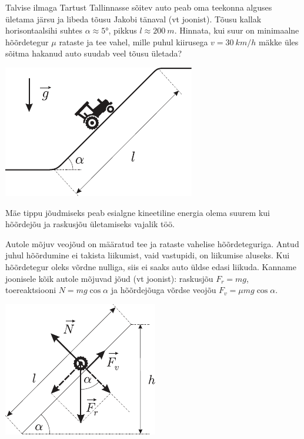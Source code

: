 
Talvise ilmaga Tartust Tallinnasse sõitev auto peab oma teekonna alguses ületama järsu ja libeda tõusu Jakobi tänaval (vt joonist). Tõusu kallak horisontaalsihi suhtes $\alpha \approx \ang{5}$, pikkus $l \approx \SI{200}{m}$. Hinnata, kui suur on minimaalne hõõrdetegur $\mu$ rataste ja tee vahel, mille puhul kiirusega $v = \SI{30}{km/h}$ mäkke üles sõitma hakanud auto suudab veel tõusu ületada?

\begin{center}
	\includegraphics[width=0.5\linewidth]{2005-lahg-02-yl}
\end{center}

\hint
Mäe tippu jõudmiseks peab esialgne kineetiline energia olema suurem kui hõõrdejõu ja raskusjõu ületamiseks vajalik töö.

\solu
Autole mõjuv veojõud on määratud tee ja rataste vahelise hõõrdeteguriga. Antud juhul hõõrdumine ei takista liikumist, vaid vastupidi, on liikumise aluseks. Kui hõõrdetegur oleks võrdne nulliga, siis ei saaks auto üldse edasi liikuda. Kanname joonisele kõik autole mõjuvad jõud (vt joonist): raskusjõu $F_r = mg$, toereaktsiooni $N = mg \cos \alpha$ ja hõõrdejõuga võrdse veojõu $F_v = \mu mg \cos \alpha$.

\begin{center}
	\includegraphics[width=0.5\linewidth]{2005-lahg-02-lah}
\end{center}

